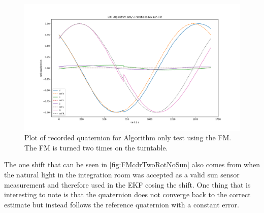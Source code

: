\begin{figure}[tbp]
	\centering
	\includegraphics[width=1\columnwidth]{./Pictures/EKF_Algorithm_only_2_rotations_No_sun_FM}
	\caption{Plot of recorded quaternion for Algorithm only test using the FM. The FM is turned two times on the turntable.}
	\label{fig:FMcdrTwoRotNoSun}
\end{figure}   

The one shift that can be seen in \autoref{fig:FMcdrTwoRotNoSun} also comes from when the natural light in the integration room was accepted as a valid sun sensor measurement and therefore used in the EKF cosing the shift. One thing that is interesting to note is that the quaternion does not converge back to the correct estimate but instead follows the reference quaternion with a constant error.     
\fi
